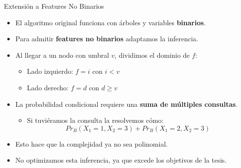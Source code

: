 \begin{frame}[noframenumbering]{Extensión a Features No Binarios}
	\begin{itemize}[<+- | alert@+>]
		\item El algoritmo original funciona con árboles y variables \textbf{binarios}.
		\item Para admitir \textbf{features no binarios} adaptamos la inferencia.
		\item Al llegar a un nodo con umbral \(v\), dividimos el dominio de \(f\):
		\begin{itemize}
			\item Lado izquierdo: \(f = i\) con \(i < v\)
			\item Lado derecho: \(f = d\) con \(d \geq v\)
		\end{itemize}
		\item La probabilidad condicional requiere una \textbf{suma de múltiples consultas}. 
		\begin{itemize}
			\item  Si tuviéramos la consulta  la resolvemos cómo:
			\[
			Pr_B(X_1=1, X_2=3) + Pr_B(X_1=2, X_2=3)
			\]
		\end{itemize}
		\item Esto hace que la complejidad ya no sea polinomial.
		\item No optimizamos esta inferencia, ya que excede los objetivos de la tesis.
	\end{itemize}
\end{frame}


